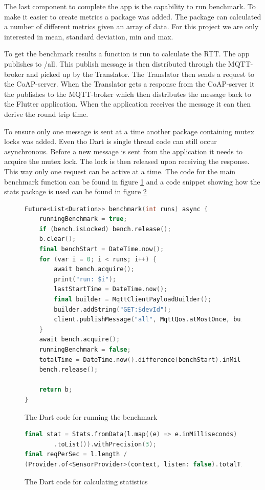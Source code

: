 The last component to complete the app is the capability to run benchmark. To make it easier to create metrics a package\cite{dartStat} was added. The package can calculated a number of different metrics given an array of data. For this project we are only interested in mean, standard deviation, min and max. 

To get the benchmark results a function is run to calculate the RTT. The app publishes to /all. This publish message is then distributed through the MQTT-broker and picked up by the Translator. The Translator then sends a request to the CoAP-server. When the Translator gets a response from the CoAP-server it the publishes to the MQTT-broker which then distributes the message back to the Flutter application. When the application receives the message it can then derive the round trip time.

To ensure only one message is sent at a time another package\cite{dartMutex} containing mutex locks was added. Even tho Dart is single thread code can still occur asynchronous. Before a new message is sent from the application it needs to acquire the mutex lock. The lock is then released upon receiving the response. This way only one request can be active at a time. The code for the main benchmark function can be found in figure \ref{code:app:bench} and a code snippet showing how the stats package is used can be found in figure \ref{code:app:stat}

\begin{figure}[H]
    \begin{lstlisting}[language=c++]
Future<List<Duration>> benchmark(int runs) async {
    runningBenchmark = true;
    if (bench.isLocked) bench.release();
    b.clear();
    final benchStart = DateTime.now();
    for (var i = 0; i < runs; i++) {
        await bench.acquire();
        print("run: $i");
        lastStartTime = DateTime.now();
        final builder = MqttClientPayloadBuilder();
        builder.addString("GET:$devId");
        client.publishMessage("all", MqttQos.atMostOnce, builder.payload!);
    }
    await bench.acquire();
    runningBenchmark = false;
    totalTime = DateTime.now().difference(benchStart).inMilliseconds;
    bench.release();

    return b;
}
    \end{lstlisting}
    \caption{The Dart code for running the benchmark}
    \label{code:app:bench}
\end{figure}

\begin{figure}[H]
    \begin{lstlisting}[language=c++]
final stat = Stats.fromData(l.map((e) => e.inMilliseconds)
        .toList()).withPrecision(3);
final reqPerSec = l.length /
(Provider.of<SensorProvider>(context, listen: false).totalTime / 1000);
    \end{lstlisting}
    \caption{The Dart code for calculating statistics}
    \label{code:app:stat}
\end{figure}

